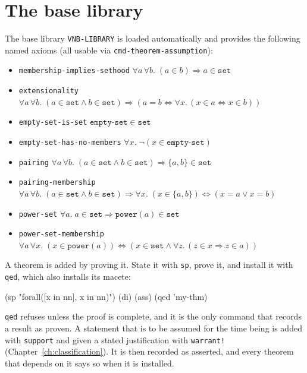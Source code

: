 \section{The base library}
\label{sec:axioms}

The base library \texttt{VNB-LIBRARY} is loaded automatically and
provides the following named axioms (all usable via
\texttt{cmd-theorem-assumption}):

\begin{itemize}
\item \texttt{membership-implies-sethood}
  $\forall a\,\forall b.\;(a \in b) \Rightarrow a \in \mathtt{set}$
\item \texttt{extensionality}
  $\forall a\,\forall b.\;(a \in \mathtt{set} \land b \in \mathtt{set}) \Rightarrow
  (a = b \Leftrightarrow \forall x.\,(x \in a \Leftrightarrow x \in b))$
\item \texttt{empty-set-is-set}
  $\texttt{empty-set} \in \mathtt{set}$
\item \texttt{empty-set-has-no-members}
  $\forall x.\;\lnot(x \in \texttt{empty-set})$
\item \texttt{pairing}
  $\forall a\,\forall b.\;(a \in \mathtt{set} \land b \in \mathtt{set}) \Rightarrow \{a,b\} \in \mathtt{set}$
\item \texttt{pairing-membership}
  $\forall a\,\forall b.\;(a \in \mathtt{set} \land b \in \mathtt{set}) \Rightarrow
  \forall x.\;(x \in \{a,b\}) \Leftrightarrow (x=a \lor x=b)$
\item \texttt{power-set}
  $\forall a.\;a \in \mathtt{set} \Rightarrow \texttt{power}(a) \in \mathtt{set}$
\item \texttt{power-set-membership}
  $\forall a\,\forall x.\;(x \in \texttt{power}(a)) \Leftrightarrow
  (x \in \mathtt{set} \land \forall z.\,(z \in x \Rightarrow z \in a))$
\end{itemize}

A theorem is added by proving it.  State it with \texttt{sp}, prove it,
and install it with \texttt{qed}, which also installs its macete:
\begin{VNBcode}
(sp "forall([x in nn], x in nn)")
(di) (ass)
(qed 'my-thm)
\end{VNBcode}
\texttt{qed} refuses unless the proof is complete, and it is the only
command that records a result as proven.  A statement that is to be
assumed for the time being is added with \texttt{support} and given a
stated justification with \texttt{warrant!}
(Chapter~\ref{ch:classification}).  It is then recorded as asserted, and
every theorem that depends on it says so when it is installed.


